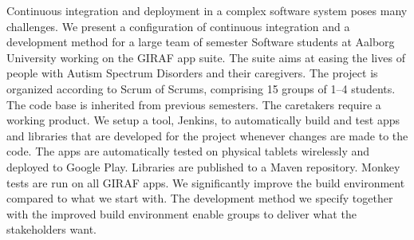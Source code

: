 Continuous integration and deployment in a complex software system poses many challenges. We present a configuration of continuous integration and a development method for a large team of  semester Software students at Aalborg University working on the GIRAF app suite. The suite aims at easing the lives of people with Autism Spectrum Disorders and their caregivers. The project is organized according to Scrum of Scrums, comprising 15 groups of 1--4 students. The code base is inherited from previous semesters. The caretakers require a working product. We setup a tool, Jenkins, to automatically build and test apps and libraries that are developed for the project whenever changes are made to the code. The apps are automatically tested on physical tablets wirelessly and deployed to Google Play. Libraries are published to a Maven repository. Monkey tests are run on all GIRAF apps. We significantly improve the build environment compared to what we start with. The development method we specify together with the improved build environment enable groups to deliver what the stakeholders want.